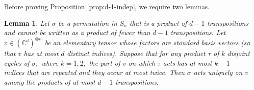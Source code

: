 \documentclass[12pt,dvipsnames,accepted=2016-08-18,a4paper,onecolumn]{quantumarticle}
\numberwithin{equation}{section}
\newtheorem{lemma}[theorem]{Lemma}
\theoremstyle{definition}
\begin{document}
Before proving Proposition \ref{prop:d-1-indep}, we require two lemmas.
    
\begin{lemma}\label{lemma:uniq} 
	Let $\sigma$ be a permutation in $S_n$ that is a product of $d-1$ transpositions and cannot be written as a product of fewer than $d-1$ transpositions.
	   Let $v \in (\mathbb{C}^d)^{\otimes n}$ be an elementary tensor whose factors are standard basis vectors (so that $v$ has at most $d$ distinct indices). Suppose that for any product $\tau$ of $k$ disjoint cycles of $\sigma,$ where $k=1,2,$ the part of $v$ on which $\tau$ acts has at most $k-1$ indices that are repeated and they occur at most twice. Then $\sigma$ acts uniquely on $v$ among the products of at most $d-1$ transpositions. 
\end{lemma}	
\end{document}
